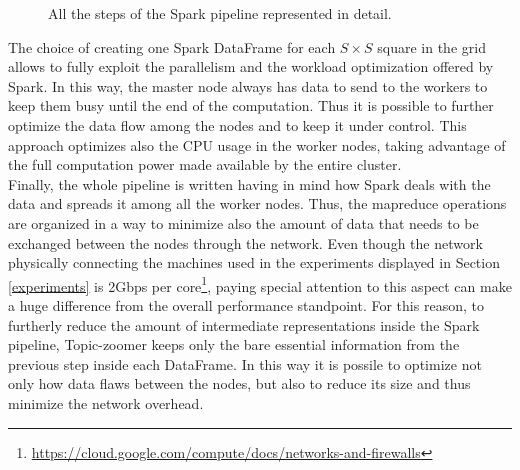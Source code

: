 \documentclass{sig-alternate-05-2015}
\begin{document}
\begin{figure}
  \caption{All the steps of the Spark pipeline represented in detail.}
  \label{spark_pipeline}
\end{figure}

The choice of creating one Spark DataFrame for each $S \times S$ square in the grid allows to fully exploit the parallelism and the workload optimization offered by Spark. In this way, the master node always has data to send to the workers to keep them busy until the end of the computation. Thus it is possible to further optimize the data flow among the nodes and to keep it under control. This approach optimizes also the CPU usage in the worker nodes, taking advantage of the full computation power made available by the entire cluster.\\
Finally, the whole pipeline is written having in mind how Spark deals with the data and spreads it among all the worker nodes. Thus, the map\-reduce operations are organized in a way to minimize also the amount of data that needs to be exchanged between the nodes through the network. Even though the network physically connecting the machines used in the experiments displayed in Section \ref{experiments} is 2Gbps per core\footnote{\url{https://cloud.google.com/compute/docs/networks-and-firewalls}}, paying special attention to this aspect can make a huge difference from the overall performance standpoint. For this reason, to furtherly reduce the amount of intermediate representations inside the Spark pipeline, Topic-zoomer keeps only the bare essential information from the previous step inside each DataFrame. In this way it is possile to optimize not only how data flaws between the nodes, but also to reduce its size and thus minimize the network overhead.
\end{document}
